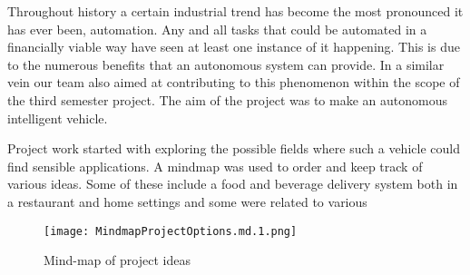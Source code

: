 \documentclass[../report.tex]{subfiles}
\begin{document}
    Throughout history a certain industrial trend has become the most pronounced 
    it has ever been, automation. Any and all tasks that could be automated in a
    financially viable way have seen at least one instance of it happening. This
    is due to the numerous benefits that an autonomous system can provide. In a
    similar vein our team also aimed at contributing to this phenomenon within 
    the scope of the third semester project. The aim of the project was to make
    an autonomous intelligent vehicle.

    Project work started with exploring the possible fields where such a vehicle
    could find sensible applications. A mindmap was used to order and keep track
    of various ideas. Some of these include a food and beverage delivery system
    both in a restaurant and home settings and some were related to various 

    \begin{figure}[H]
        \centering
        \texttt{[image: MindmapProjectOptions.md.1.png]}
        \caption{Mind-map of project ideas}
    \end{figure}   
\end{document}
